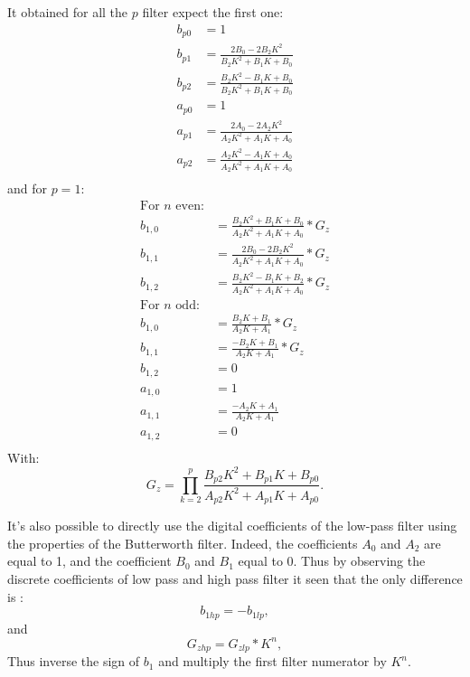 \documentclass[twoside,twocolumn]{article}
\begin{document}
It obtained for all the $p$ filter expect the first one:
\begin{equation}
\begin{split}
b_{p0}&=1\\
b_{p1}&=\frac{2B_0-2B_2K^2}{B_2K^2+B_1K+B_0}\\
b_{p2}&=\frac{B_2K^2-B_1K+B_0}{B_2K^2+B_1K+B_0}\\
a_{p0}&=1\\
a_{p1}&=\frac{2A_0-2A_2K^2}{A_2K^2+A_1K+A_0}\\
a_{p2}&=\frac{A_2K^2-A_1K+A_0}{A_2K^2+A_1K+A_0}\\
\end{split}
\end{equation}
and for $p=1$:
\begin{equation}
\begin{split}
\text{For } n \text{ even:}\\
b_{1,0}&=\frac{B_2K^2+B_1K+B_0}{A_2K^2+A_1K+A_0}*G_z\\
b_{1,1}&=\frac{2B_0-2B_2K^2}{A_2K^2+A_1K+A_0}*G_z\\
b_{1,2}&=\frac{B_2K^2-B_1K+B_2}{A_2K^2+A_1K+A_0}*G_z\\
\text{For } n \text{ odd:}\\
b_{1,0}&=\frac{B_2K+B_1}{A_2K+A_1}*G_z\\
b_{1,1}&=\frac{-B_2K+B_1}{A_2K+A_1}*G_z\\
b_{1,2}&=0\\
a_{1,0}&=1\\
a_{1,1}&=\frac{-A_2K+A_1}{A_2K+A_1}\\
a_{1,2}&=0\\
\end{split}	
\end{equation}
With:
\begin{equation}
G_z=\prod_{k=2}^{p}\frac{B_{p2}K^2+B_{p1}K+B_{p0}}{A_{p2}K^2+A_{p1}K+A_{p0}}.
\end{equation} 

It's also possible to directly use the digital coefficients of the low-pass filter using the properties of the Butterworth filter. Indeed, the coefficients $A_0$ and $A_2$ are equal to 1, and the coefficient $B_0$ and $B_1$ equal to 0. Thus by observing the discrete coefficients of low pass and high pass filter it seen that the only difference is :
\begin{equation}
b_{1hp}=-b_{1lp},
\end{equation}
and 
\begin{equation}
G_{zhp}=G_{zlp}*K^n,
\end{equation}
Thus inverse the sign of $b_1$ and multiply the first filter numerator by  $K^n$.
\end{document}
